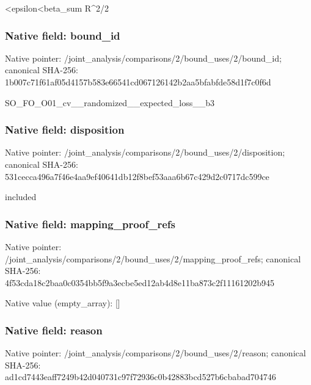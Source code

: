 \documentclass[10pt,a4paper]{article}
\begin{document}
\begingroup\raggedright{}<epsilon<beta\_\allowbreak{}sum R\textasciicircum{}2/\allowbreak{}2\par\endgroup

\subsubsection{Native field: bound\_\allowbreak{}id}
Native pointer: /joint\_\allowbreak{}analysis/comparisons/2/bound\_\allowbreak{}uses/2/bound\_\allowbreak{}id; canonical SHA-256: 1b007c71f61af05d4157b583e66541cd067126142b2aa5bfabfde58d1f7c0f6d

\begingroup\raggedright\sloppy SO\_\allowbreak{}FO\_\allowbreak{}O01\_\allowbreak{}cv\_\allowbreak{}\_\allowbreak{}randomized\_\allowbreak{}\_\allowbreak{}expected\_\allowbreak{}loss\_\allowbreak{}\_\allowbreak{}b3\par\endgroup

\subsubsection{Native field: disposition}
Native pointer: /joint\_\allowbreak{}analysis/comparisons/2/bound\_\allowbreak{}uses/2/disposition; canonical SHA-256: 531cecca496a7f46e4aa9ef40641db12f8bef53aaa6b67c429d2c0717dc599ce

\begingroup\raggedright\sloppy included\par\endgroup

\subsubsection{Native field: mapping\_\allowbreak{}proof\_\allowbreak{}refs}
Native pointer: /joint\_\allowbreak{}analysis/comparisons/2/bound\_\allowbreak{}uses/2/mapping\_\allowbreak{}proof\_\allowbreak{}refs; canonical SHA-256: 4f53cda18c2baa0c0354bb5f9a3ecbe5ed12ab4d8e11ba873c2f11161202b945

Native value (empty\_\allowbreak{}array): []

\subsubsection{Native field: reason}
Native pointer: /joint\_\allowbreak{}analysis/comparisons/2/bound\_\allowbreak{}uses/2/reason; canonical SHA-256: ad1cd7443eaff7249b42d040731c97f72936c0b42883bcd527b6cbabad704746
\end{document}
